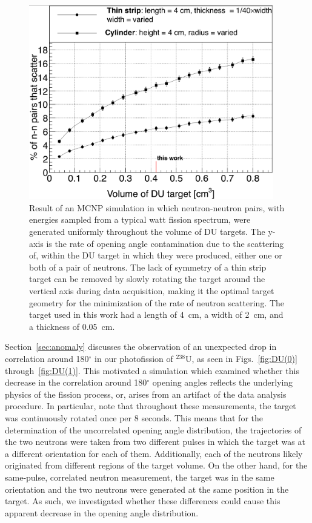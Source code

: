 \begin{figure}
    \centering
    \includegraphics[width = 0.95\textwidth]{Content/Errors/ElasticScatteringPlot.png}
    \caption{
     Result of an MCNP simulation in which neutron-neutron pairs, with energies sampled from a typical watt fission spectrum, were generated uniformly throughout the volume of DU targets.
        The y-axis is the rate of opening angle contamination due to the scattering of, within the DU target in which they were produced, either one or both of a pair of neutrons.
    The lack of symmetry of a thin strip target can be removed by slowly rotating the target around the vertical axis during data acquisition, making it the optimal target geometry for the minimization of the rate of neutron scattering.
    The target used in this work had a length of 4~cm, a width of 2~cm, and a thickness of 0.05~cm.
    }
    \label{fig:ElasticScatteringPlot}
\end{figure}

Section~\ref{sec:anomaly} discusses the observation of an unexpected drop in correlation around 180$^{\circ}$ in our photofission of $^{238}$U, as seen in Figs.~\ref{fig:DU(0)} through~\ref{fig:DU(1)}.
This motivated a simulation which examined whether this decrease in the correlation around 180$^{\circ}$ opening angles reflects the underlying physics of the fission process, or, arises from an artifact of the data analysis procedure.
In particular, note that throughout these measurements, the target was continuously rotated once per 8 seconds.
This means that for the determination of the uncorrelated opening angle distribution, the trajectories of the two neutrons were taken from two different pulses in which the target was at a different orientation for each of them.
Additionally, each of the neutrons likely originated from different regions of the target volume.
On the other hand, for the same-pulse, correlated neutron measurement, the target was in the same orientation and the two neutrons were generated at the same position in the target.
As such, we investigated whether these differences could cause this apparent decrease in the opening angle distribution.

